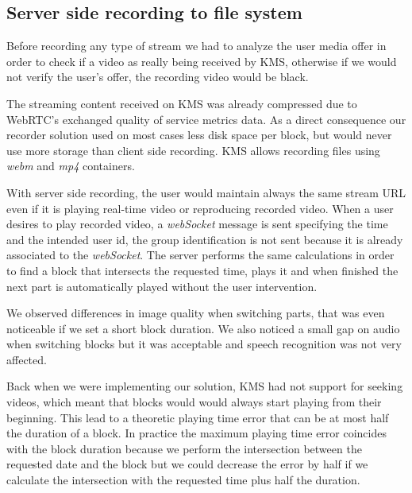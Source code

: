 \subsection{Server side recording to file system}

	Before recording any type of stream we had to analyze the user media offer in order to check if a video as really being received by \ac{KMS}, otherwise if we would not verify the user's offer, the recording video would be black.

	The streaming content received on \ac{KMS} was already compressed due to \ac{WebRTC}'s exchanged quality of service metrics data. As a direct consequence our recorder solution used on most cases less disk space per block, but would never use more storage than client side recording. \ac{KMS} allows recording files using \emph{webm} and \emph{mp4} containers.

	With server side recording, the user would maintain always the same stream \ac{URL} even if it is playing real-time video or reproducing recorded video. When a user desires to play recorded video, a \emph{webSocket} message is sent specifying the time and the intended user id, the group identification is not sent because it is already associated to the \emph{webSocket}. The server performs the same calculations in order to find a block that intersects the requested time, plays it and when finished the next part is automatically played without the user intervention.

	We observed differences in image quality when switching parts, that was even noticeable if we set a short block duration. We also noticed a small gap on audio when switching blocks but it was acceptable and speech recognition was not very affected. 

	Back when we were implementing our solution, \ac{KMS} had not support for seeking videos, which meant that blocks would would always start playing from their beginning. This lead to a theoretic playing time error that can be at most half the duration of a block. In practice the maximum playing time error coincides with the block duration because we perform the intersection between the requested date and the block but we could decrease the error by half if we calculate the intersection with the requested time plus half the duration. 


